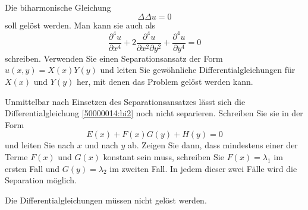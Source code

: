 Die biharmonische Gleichung
\begin{equation}
\Delta\Delta u =0
\label{50000014:bi}
\end{equation}
soll
gelöst werden.
Man kann sie auch als
\begin{equation}
\frac{\partial^4u}{\partial x^4}
+
2\frac{\partial^4u}{\partial x^2\partial y^2}
+
\frac{\partial^4u}{\partial y^4}
=
0
\label{50000014:bi2}
\end{equation}
schreiben.
Verwenden Sie einen Separationsansatz der Form $u(x,y)=X(x)Y(y)$
und leiten Sie gewöhnliche Differentialgleichungen für $X(x)$ und $Y(y)$
her, mit denen das Problem gelöst werden kann.

\begin{hinweis}
Unmittelbar nach Einsetzen des Separationsansatzes lässt sich die 
Differentialgleichung \eqref{50000014:bi2} noch nicht separieren.
Schreiben Sie sie in der Form
\[
E(x) + F(x)G(y) + H(y) = 0
\]
und leiten Sie nach $x$ und nach $y$ ab.
Zeigen Sie dann, dass mindestens einer der Terme $F(x)$ und $G(x)$ konstant
sein muss, schreiben Sie $F(x)=\lambda_1$ im ersten Fall und $G(y)=\lambda_2$ 
im zweiten Fall.
In jedem dieser zwei Fälle wird die Separation möglich.

Die Differentialgleichungen müssen nicht gelöst werden.
\end{hinweis}


